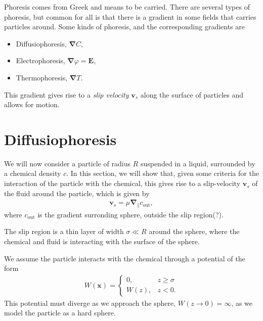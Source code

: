 Phoresis comes from Greek and means to be carried.
There are several types of phoresis, but common for all is that there is a gradient in some fields that carries particles around.
Some kinds of phoresis, and the corresponding gradients are
\begin{itemize}
    \item Diffusiophoresis, $\bm \nabla C$,
    \item Electrophoresis, $\bm \nabla \varphi = \bm E$,
    \item Thermophoresis, $\bm \nabla T$.
\end{itemize}
%
This gradient gives rise to a \emph{slip velocity} $\bm v_s$ along the surface of particles and allows for motion.


\section{Diffusiophoresis}

We will now consider a particle of radius $R$ suspended in a liquid, surrounded by a chemical density $c$.
In this section, we will show that, given some criteria for the interaction of the particle with the chemical, this gives rise to a slip-velocity $\bm v_s$ of the fluid around the particle, which is given by
%
\begin{align}
    \bm v_s  = \mu \bm \nabla_\parallel c_{\mathrm{out}},
\end{align}
%
where $c_{\mathrm{out}}$ is the gradient surronding sphere, outside the slip region(?).

The slip region is a thin layer of width $\sigma \ll R$ around the sphere, where the chemical and fluid is interacting with the surface of the sphere.

We assume the particle interacts with the chemical through a potential of the form
%
\begin{align}
    W(\bm x) = 
    \begin{cases}
        0 , & z \geq \sigma \\
        W(z), & z < 0.
    \end{cases}
\end{align}
%
This potential must diverge as we approach the sphere, $W(z\rightarrow 0) = \infty$, as we model the particle as a hard sphere.


